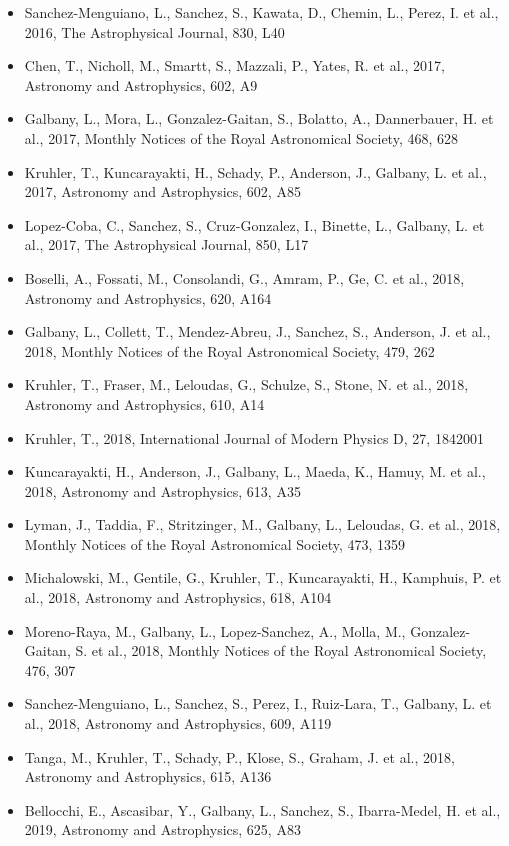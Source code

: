 \documentclass{letter}
\begin{document}
\begin{enumerate}
\begin{itemize}
\item Sanchez-Menguiano, L., Sanchez, S., Kawata, D., Chemin, L., Perez, I. et al., 2016, The Astrophysical Journal, 830, L40
\item Chen, T., Nicholl, M., Smartt, S., Mazzali, P., Yates, R. et al., 2017, Astronomy and Astrophysics, 602, A9
\item Galbany, L., Mora, L., Gonzalez-Gaitan, S., Bolatto, A., Dannerbauer, H. et al., 2017, Monthly Notices of the Royal Astronomical Society, 468, 628
\item Kruhler, T., Kuncarayakti, H., Schady, P., Anderson, J., Galbany, L. et al., 2017, Astronomy and Astrophysics, 602, A85
\item Lopez-Coba, C., Sanchez, S., Cruz-Gonzalez, I., Binette, L., Galbany, L. et al., 2017, The Astrophysical Journal, 850, L17
\item Boselli, A., Fossati, M., Consolandi, G., Amram, P., Ge, C. et al., 2018, Astronomy and Astrophysics, 620, A164
\item Galbany, L., Collett, T., Mendez-Abreu, J., Sanchez, S., Anderson, J. et al., 2018, Monthly Notices of the Royal Astronomical Society, 479, 262
\item Kruhler, T., Fraser, M., Leloudas, G., Schulze, S., Stone, N. et al., 2018, Astronomy and Astrophysics, 610, A14
\item Kruhler, T., 2018, International Journal of Modern Physics D, 27, 1842001
\item Kuncarayakti, H., Anderson, J., Galbany, L., Maeda, K., Hamuy, M. et al., 2018, Astronomy and Astrophysics, 613, A35
\item Lyman, J., Taddia, F., Stritzinger, M., Galbany, L., Leloudas, G. et al., 2018, Monthly Notices of the Royal Astronomical Society, 473, 1359
\item Michalowski, M., Gentile, G., Kruhler, T., Kuncarayakti, H., Kamphuis, P. et al., 2018, Astronomy and Astrophysics, 618, A104
\item Moreno-Raya, M., Galbany, L., Lopez-Sanchez, A., Molla, M., Gonzalez-Gaitan, S. et al., 2018, Monthly Notices of the Royal Astronomical Society, 476, 307
\item Sanchez-Menguiano, L., Sanchez, S., Perez, I., Ruiz-Lara, T., Galbany, L. et al., 2018, Astronomy and Astrophysics, 609, A119
\item Tanga, M., Kruhler, T., Schady, P., Klose, S., Graham, J. et al., 2018, Astronomy and Astrophysics, 615, A136
\item Bellocchi, E., Ascasibar, Y., Galbany, L., Sanchez, S., Ibarra-Medel, H. et al., 2019, Astronomy and Astrophysics, 625, A83

\end{itemize}
\end{enumerate}
\end{document}
